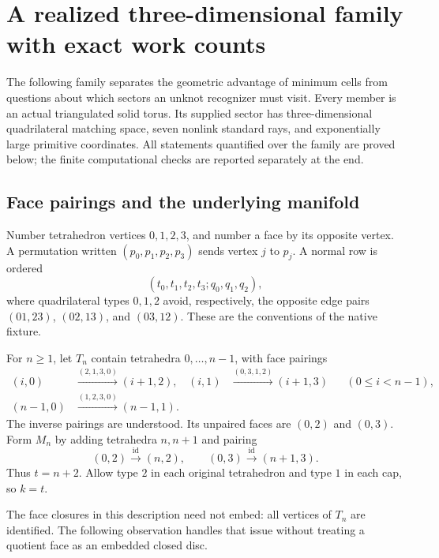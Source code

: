 \section{A realized three-dimensional family with exact work counts}
\label{fib:section}
\label{fib:family}

The following family separates the geometric advantage of minimum cells
from questions about which sectors an unknot recognizer must visit.  Every
member is an actual triangulated solid torus.  Its supplied sector has
three-dimensional quadrilateral matching space, seven nonlink standard
rays, and exponentially large primitive coordinates.  All statements
quantified over the family are proved below; the finite computational
checks are reported separately at the end.

\subsection{Face pairings and the underlying manifold}
\label{fib:source}

Number tetrahedron vertices \(0,1,2,3\), and number a face by its opposite
vertex.  A permutation written \((p_0,p_1,p_2,p_3)\) sends vertex \(j\) to
\(p_j\).  A normal row is ordered
\[
 (t_0,t_1,t_2,t_3;q_0,q_1,q_2),
\]
where quadrilateral types \(0,1,2\) avoid, respectively, the opposite
edge pairs \((01,23)\), \((02,13)\), and \((03,12)\).
These are the conventions of the native fixture.

For \(n\geq1\), let \(T_n\) contain tetrahedra \(0,\ldots,n-1\), with
face pairings
\begin{align}
 (i,0)&\xrightarrow{(2,1,3,0)}(i+1,2),&
 (i,1)&\xrightarrow{(0,3,1,2)}(i+1,3)
       &&(0\leq i<n-1),\label{fib:layer-pairings}\\
 (n-1,0)&\xrightarrow{(1,2,3,0)}(n-1,1).
 \label{fib:core-pairing}
\end{align}
The inverse pairings are understood.  Its unpaired faces are \((0,2)\)
and \((0,3)\).  Form \(M_n\) by adding tetrahedra \(n,n+1\) and pairing
\begin{equation}
 (0,2)\xrightarrow{\mathrm{id}}(n,2),\qquad
 (0,3)\xrightarrow{\mathrm{id}}(n+1,3).
 \label{fib:cap-pairings}
\end{equation}
Thus \(t=n+2\).  Allow type \(2\) in each original tetrahedron and type
\(1\) in each cap, so \(k=t\).

The face closures in this description need not embed: all vertices of
\(T_n\) are identified.  The following observation handles that issue
without treating a quotient face as an embedded closed disc.

